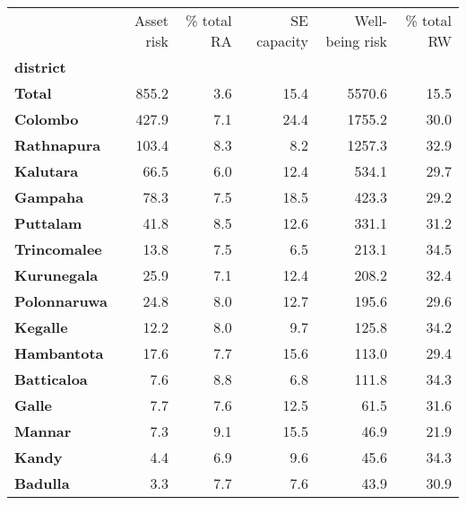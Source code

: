 \begin{tabular}{lrrrrr}
\toprule
{} &  Asset risk &  \% total RA &  SE capacity &  Well-being risk &  \% total RW \\
\textbf{district    } &             &             &              &                  &             \\
\midrule
\textbf{Total       } &       855.2 &         3.6 &         15.4 &           5570.6 &        15.5 \\
\textbf{Colombo     } &       427.9 &         7.1 &         24.4 &           1755.2 &        30.0 \\
\textbf{Rathnapura  } &       103.4 &         8.3 &          8.2 &           1257.3 &        32.9 \\
\textbf{Kalutara    } &        66.5 &         6.0 &         12.4 &            534.1 &        29.7 \\
\textbf{Gampaha     } &        78.3 &         7.5 &         18.5 &            423.3 &        29.2 \\
\textbf{Puttalam    } &        41.8 &         8.5 &         12.6 &            331.1 &        31.2 \\
\textbf{Trincomalee } &        13.8 &         7.5 &          6.5 &            213.1 &        34.5 \\
\textbf{Kurunegala  } &        25.9 &         7.1 &         12.4 &            208.2 &        32.4 \\
\textbf{Polonnaruwa } &        24.8 &         8.0 &         12.7 &            195.6 &        29.6 \\
\textbf{Kegalle     } &        12.2 &         8.0 &          9.7 &            125.8 &        34.2 \\
\textbf{Hambantota  } &        17.6 &         7.7 &         15.6 &            113.0 &        29.4 \\
\textbf{Batticaloa  } &         7.6 &         8.8 &          6.8 &            111.8 &        34.3 \\
\textbf{Galle       } &         7.7 &         7.6 &         12.5 &             61.5 &        31.6 \\
\textbf{Mannar      } &         7.3 &         9.1 &         15.5 &             46.9 &        21.9 \\
\textbf{Kandy       } &         4.4 &         6.9 &          9.6 &             45.6 &        34.3 \\
\textbf{Badulla     } &         3.3 &         7.7 &          7.6 &             43.9 &        30.9 \\

\end{tabular}
